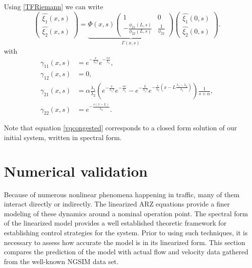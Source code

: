 \documentclass[preprint]{elsarticle}
\begin{document}
Using \eqref{TFRiemann} we can write 
\begin{equation} \label{vqcongested}
\begin{pmatrix}
\hat{\xi_{1}}(x,s)\\
\hat{\xi_{2}}(x,s)
\end{pmatrix} = \underbrace{
\Phi(x,s) \begin{pmatrix}
1 & 0\\
-\frac{\phi_{21}\left(L,s\right)}{\phi_{22}\left(L,s\right)} & \frac{1}{\phi_{22}}
\end{pmatrix}}_\text{$\Gamma (x,s)$}
\begin{pmatrix}
\hat{\xi_{1}}\left(0,s\right)\\
\hat{\xi_{2}}\left(0,s\right)
\end{pmatrix}.
\end{equation}
with 
\begin{subequations}
\begin{align}
\gamma_{11}\left(x,s\right)&=e^{-\frac{x}{\lambda_{1}\tau}}e^{-\frac{sx}{\lambda_{1}}}, \\
\gamma_{12}\left(x,s\right)&=0, \\
\gamma_{21}\left(x,s\right)&=\alpha\frac{\lambda_{1}}{\lambda_{2}}\left(e^{-\frac{x}{\lambda_{1}\tau}}e^{-\frac{sx}{\lambda_{1}}}-e^{-\frac{L}{\lambda_{1}\tau}}e^{-\frac{s}{\lambda_{2}}\left(x-L\frac{\lambda_{1}-\lambda_{2}}{\lambda_{1}}\right)}\right)\frac{1}{s+\alpha}, \\
\gamma_{22}\left(x,s\right)&=e^{-\frac{s\left(x-L\right)}{\lambda_{2}}}.
\end{align}
\end{subequations}

Note that equation \eqref{vqcongested} corresponds to a closed form solution of our initial system, written in spectral form.

\section{Numerical validation}

Because of numerous nonlinear phenomena happening in traffic, many of them interact directly or indirectly. The linearized ARZ equations provide a finer modeling of these dynamics around a nominal operation point. The spectral form of the linearized
model provides a well established theoretic framework for establishing control strategies for the system. Prior to
using such techniques, it is necessary to assess how accurate the
model is in its linearized form. This section compares the prediction of the model with actual flow
and velocity data gathered from the well-known NGSIM data set.
\end{document}
